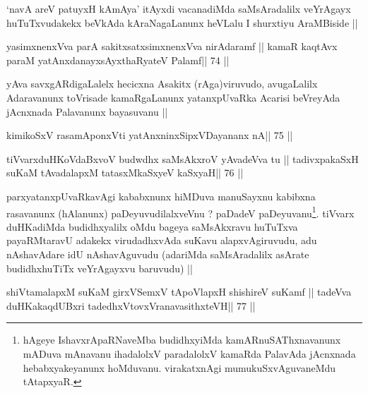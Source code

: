 \begin{artha}
`navA areV patuyxH kAmAya' itAyxdi vacanadiMda saMsAradalilx veYrAgayx
  huTuTxvudakekx beVkAda kAraNagaLanunx heVLalu I shurxtiyu AraMBiside ||
\end{artha}


\begin{shl}
yasimxnenxVva parA sakitxsatxsimxnenxVva nirAdaramf ||
kamaR kaqtAvx paraM yatAnxdanayxsAyxthaRyateV Palamf\hfill || 74 ||
\end{shl}

\begin{artha}
yAva savxgARdigaLalelx hecicxna Asakitx (rAga)viruvudo, avugaLalilx
Adaravanunx toVrisade kamaRgaLanunx yatanxpUvaRka Acarisi beVreyAda
jAcnxnada Palavanunx bayasuvanu ||
\end{artha}


\begin{shl}
kimikoSxV rasamAponxVti yatAnxninxSipxVDayananx nA\hfill || 75 ||
\end{shl}

\begin{shl}
tiVvarxduHKoVdaBxvoV budwdhx saMsAkxroV yAvadeVva tu ||
tadivxpakaSxH suKaM tAvadalapxM tatasxMkaSxyeV kaSxyaH\hfill || 76 ||
\end{shl}

\begin{artha}
parxyatanxpUvaRkavAgi kababxnunx hiMDuva manuSayxnu kabibxna
rasavanunx (hAlanunx) paDeyuvudilalxveVnu ? paDadeV
paDeyuvanu\footnote[1]{hAgeye IshavxrApaRNaveMba budidhxyiMda
  kamARnuSAThxnavanunx mADuva mAnavanu ihadalolxV paradalolxV kamaRda
  PalavAda jAcnxnada hebabxyakeyanunx hoMduvanu. virakatxnAgi
  mumukuSxvAguvaneMdu tAtapxyaR.}. tiVvarx duHKadiMda budidhxyalilx
oMdu bageya saMsAkxravu huTuTxva payaRMtaravU adakekx virudadhxvAda
suKavu alapxvAgiruvudu, adu nAshavAdare idU nAshavAguvudu (adariMda
saMsAradalilx asArate budidhxhuTiTx veYrAgayxvu baruvudu) ||
\end{artha}


\begin{shl}
shiVtamalapxM suKaM girxVSemxV tApoV\s lapxH shishireV suKamf ||
tadeVva duHKakaqdUBxri tadedhxVtovxVranavasithxteVH\hfill || 77 ||
\end{shl}

